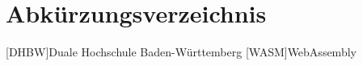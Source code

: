 \section*{Abkürzungsverzeichnis}
\begin{acronym}
	[DHBW]{Duale Hoch\-schule Baden-Württem\-berg}
	[WASM]{WebAssembly}
\end{acronym}